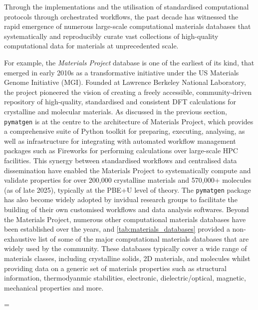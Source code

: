 Through the implementations and the utilisation of standardised computational protocols through orchestrated workflows, the past decade has witnessed the rapid emergence of numerous large-scale computational materials databases that systematically and reproducibly curate vast collections of high-quality computational data for materials at unprecedented scale.  

For example, the \textit{Materials Project}\cite{jain_apl_mater} database is one of the earliest of its kind, that emerged in early 2010s as a transformative initiative under the US Materials Genome Initiative (MGI). Founded at Lawrence Berkeley National Laboratory, the project pioneered the vision of creating a freely accessible, community-driven repository of high-quality, standardised and consistent DFT calculations for crystalline and molecular materials. As discussed in the previous section, \texttt{pymatgen}\cite{ong2013python} is at the centre to the architecture of Materials Project, which provides a comprehensive suite of Python toolkit for preparing, executing, analysing, as well as  infrastructure for integrating with automated workflow management packages such as Fireworks\cite{jain2015fireworks} for performing calculations over large-scale HPC facilities. This synergy between standardised workflows and centralised data dissemination have enabled the Materials Project to systematically compute and validate properties for over 200,000 crystalline materials and 570,000+ molecules (as of late 2025), typically at the PBE+U level of theory. The \texttt{pymatgen} package has also  become widely adopted by invidual research groups to facilitate the building of their own customised workflows and data analysis softwares. Beyond the Materials Project, numerous other computational materials databases have been established over the years, and \cref{tab:materials_databases} provided a non-exhaustive list of some of the major computational materials databases that are widely used by the community. These databases typically cover a wide range of materials classes, including crystalline solids, 2D materials, and molecules whilst providing data on a generic set of materials properties such as structural information, thermodyanmic stabilities, electronic, dielectric/optical, magnetic, mechanical properties and more. 

\begingroup %
\renewcommand{\arraystretch}{1.2}  
\LTcapwidth=\textwidth

